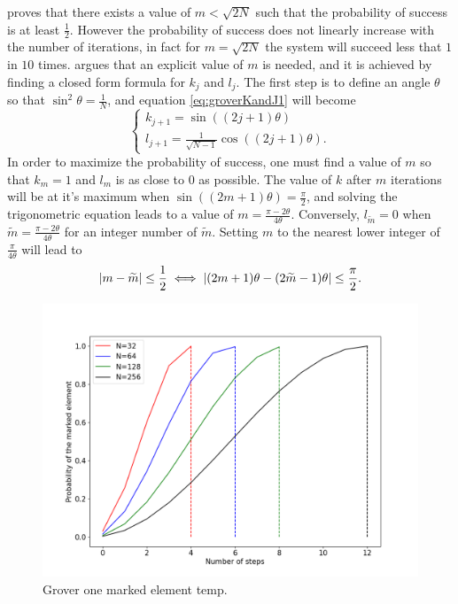 \documentclass[../../dissertation.tex]{subfiles}
\begin{document}
\cite{grover1996} proves that there exists a value of $m < \sqrt{2N}$ such that
the probability of success is at least $\frac{1}{2}$. However the probability
of success does not linearly increase with the number of iterations, in fact
for $m=\sqrt{2N}$ the system will succeed less that $1$ in $10$ times.
\cite{boyer1996} argues that an explicit value of $m$ is needed, and it is
achieved by finding a closed form formula for $k_j$ and $l_j$. The first step
is to define an angle $\theta$ so that $\sin^2\theta = \frac{1}{N}$, and
equation \ref{eq:groverKandJ1} will become
\begin{equation}
	\begin{cases}
		k_{j+1} = \sin{((2j+1)\theta)} 
		\\l_{j+1} = \frac{1}{\sqrt{N-1}}\cos{((2j+1)\theta)}.
	\end{cases}\label{eq:groverKandJ2}
\end{equation}
In order to maximize the probability of success, one must find a value of $m$
so that $k_m = 1$ and $l_m$ is as close to $0$ as possible. The value of $k$
after $m$ iterations will be at it's maximum when $\sin{((2m+1)\theta)} =
\frac{\pi}{2}$, and solving the trigonometric equation leads to a value of $m =
\frac{\pi-2\theta}{4\theta}$. Conversely, $l_{\widetilde{m}} = 0$ when
$\widetilde{m} = \frac{\pi-2\theta}{4\theta}$ for an integer number of
$\widetilde{m}$. Setting $m$ to the nearest lower integer of
$\frac{\pi}{4\theta}$ will lead to
\begin{equation}
	\abs{m-\widetilde{m}} \leq \frac{1}{2} \iff \abs{(2m+1)\theta - (2\widetilde{m}-1)\theta} \leq \frac{\pi}{2}.
\end{equation}
\begin{figure}[!h]
	\centering
	\includegraphics[scale=0.40]{img/Grover/GroverOneMarked3264128256}
	\caption{Grover one marked element temp.} 
	\label{fig:groverOneMarked163264128}
\end{figure}
\end{document}
